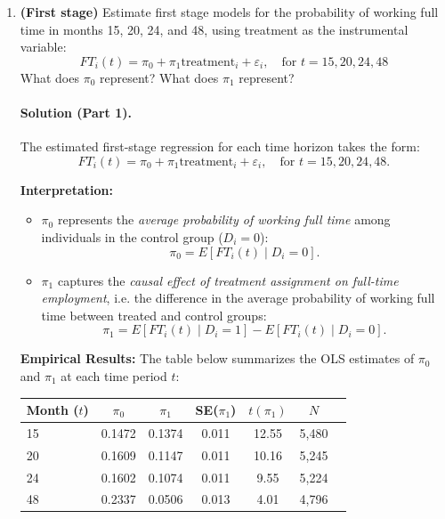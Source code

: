 \documentclass[12pt]{article}
\begin{document}
\begin{enumerate}[label=\arabic*.]

    \item \textbf{(First stage)} Estimate first stage models for the probability of working full time in months 15, 20, 24, and 48, using treatment as the instrumental variable:
    \[
    FT_i(t) = \pi_0 + \pi_1 \text{treatment}_i + \varepsilon_i, \quad \text{for } t = 15, 20, 24, 48
    \]
    What does $\pi_0$ represent? What does $\pi_1$ represent?

    \paragraph{Solution (Part 1).}
    The estimated first-stage regression for each time horizon takes the form:
    \[
    FT_i(t) = \pi_0 + \pi_1 \text{treatment}_i + \varepsilon_i, \quad \text{for } t = 15, 20, 24, 48.
    \]

    \textbf{Interpretation:}
    \begin{itemize}
        \item $\pi_0$ represents the \emph{average probability of working full time} among individuals in the control group ($D_i = 0$):
        \[
        \pi_0 = E[FT_i(t) \mid D_i = 0].
        \]
        \item $\pi_1$ captures the \emph{causal effect of treatment assignment on full-time employment}, i.e. the difference in the average probability of working full time between treated and control groups:
        \[
        \pi_1 = E[FT_i(t) \mid D_i = 1] - E[FT_i(t) \mid D_i = 0].
        \]
    \end{itemize}

    \textbf{Empirical Results:}
    The table below summarizes the OLS estimates of $\pi_0$ and $\pi_1$ at each time period $t$:

    \begin{center}
    \begin{tabular}{@{}lcccccc@{}}
    \toprule
    Month ($t$) & $\pi_0$ & $\pi_1$ & SE($\pi_1$) & $t(\pi_1)$ & $N$ \\
    \midrule
    15 & 0.1472 & 0.1374 & 0.011 & 12.55 & 5,480 \\
    20 & 0.1609 & 0.1147 & 0.011 & 10.16 & 5,245 \\
    24 & 0.1602 & 0.1074 & 0.011 & 9.55 & 5,224 \\
    48 & 0.2337 & 0.0506 & 0.013 & 4.01 & 4,796 \\
    \bottomrule
    \end{tabular}
    \end{center}


\end{enumerate}
\end{document}
